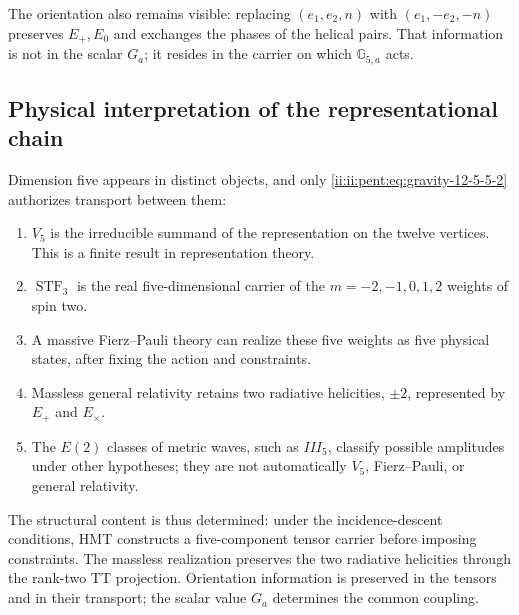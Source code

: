 The orientation also remains visible: replacing
\((e_1,e_2,n)\) with \((e_1,-e_2,-n)\) preserves \(E_+,E_0\) and exchanges
the phases of the helical pairs. That information is not in the
scalar \(G_a\); it resides in the carrier on which
\(\mathbb G_{5,a}\) acts.

\subsection{Physical interpretation of the representational chain}

Dimension five appears in distinct objects, and only
\eqref{ii:ii:pent:eq:gravity-12-5-5-2} authorizes transport between them:

\begin{enumerate}
\item \(V_5\) is the irreducible summand of the representation on the
twelve vertices. This is a finite result in representation theory.
\item \(\operatorname{STF}_3\) is the real five-dimensional carrier of
the \(m=-2,-1,0,1,2\) weights of spin two.
\item A massive Fierz--Pauli theory can realize these five weights
as five physical states, after fixing the action and constraints.
\item Massless general relativity retains two radiative helicities,
\(\pm2\), represented by \(E_+\) and \(E_\times\).
\item The \(E(2)\) classes of metric waves, such as \(III_5\), classify
possible amplitudes under other hypotheses; they are not automatically
\(V_5\), Fierz--Pauli, or general relativity.
\end{enumerate}

The structural content is thus determined: under the incidence-descent
conditions, HMT constructs a five-component tensor carrier
before imposing constraints. The massless realization preserves
the two radiative helicities through the rank-two TT projection.
Orientation information is preserved in the tensors and in their
transport; the scalar value \(G_a\) determines the common coupling.
